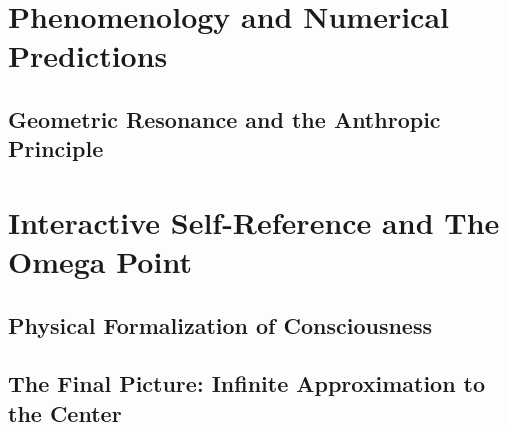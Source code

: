 \documentclass[11pt,a4paper,twoside]{book}
\begin{document}
\part{Phenomenology and Numerical Predictions}

\chapter{Geometric Resonance and the Anthropic Principle}





\part{Interactive Self-Reference and The Omega Point}

\chapter{Physical Formalization of Consciousness}




\chapter{The Final Picture: Infinite Approximation to the Center}










\end{document}
